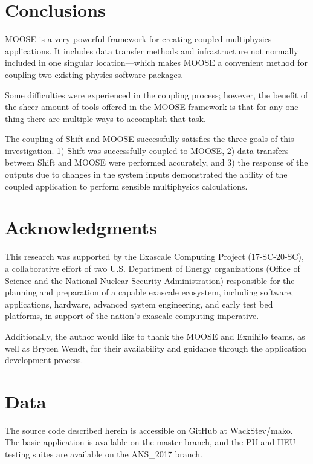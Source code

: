 \documentclass{anstrans}
\begin{document}
\section{Conclusions}
MOOSE is a very powerful framework for creating coupled multiphysics applications. It includes data transfer methods and infrastructure not normally included in one singular location---which makes MOOSE a convenient method for coupling two existing physics software packages. 

Some difficulties were experienced in the coupling process; however, the benefit of the sheer amount of tools offered in the MOOSE framework is that for any-one thing there are multiple ways to accomplish that task.

The coupling of Shift and MOOSE successfully satisfies the three goals of this investigation. 1) Shift was successfully coupled to MOOSE, 2) data transfers between Shift and MOOSE were performed accurately, and 3) the response of the outputs due to changes in the system inputs demonstrated the ability of the coupled application to perform sensible multiphysics calculations. 
\section{Acknowledgments}

This research was supported by the Exascale Computing Project (17-SC-20-SC), a collaborative effort of two U.S. Department of Energy organizations (Office of Science and the National Nuclear Security Administration) responsible for the planning and preparation of a capable exascale ecosystem, including software, applications, hardware, advanced system engineering, and early test bed platforms, in support of the nation's exascale computing imperative.

Additionally, the author would like to thank the MOOSE and Exnihilo teams, as well as Brycen Wendt, for their availability and guidance through the application development process.

\appendix
\section{Data}
The source code described herein is accessible on GitHub at WackStev/mako. The basic application is available on the master branch, and the PU and HEU testing suites are available on the ANS\_2017 branch. 



\end{document}
